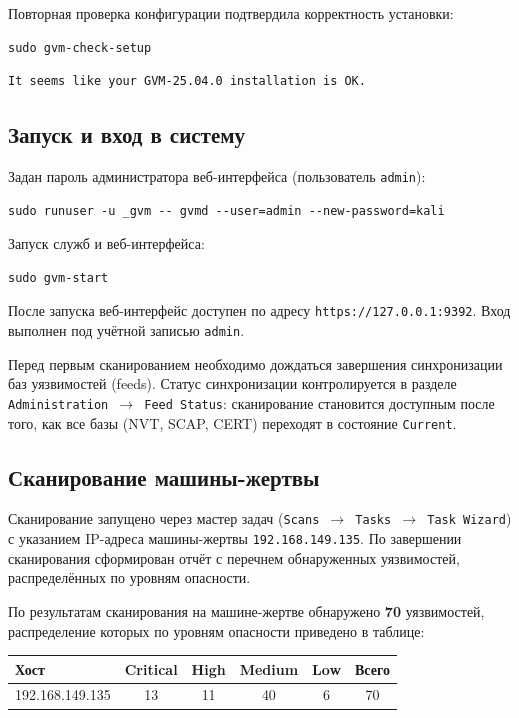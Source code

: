 \documentclass[a4paper,14pt]{extarticle}
\begin{document}
Повторная проверка конфигурации подтвердила корректность установки:

\begin{lstlisting}
sudo gvm-check-setup
\end{lstlisting}

\begin{lstlisting}
It seems like your GVM-25.04.0 installation is OK.
\end{lstlisting}

\subsection{Запуск и вход в систему}

Задан пароль администратора веб-интерфейса (пользователь \texttt{admin}):

\begin{lstlisting}
sudo runuser -u _gvm -- gvmd --user=admin --new-password=kali
\end{lstlisting}

Запуск служб и веб-интерфейса:

\begin{lstlisting}
sudo gvm-start
\end{lstlisting}

После запуска веб-интерфейс доступен по адресу \texttt{https://127.0.0.1:9392}. Вход выполнен под учётной записью \texttt{admin}.

Перед первым сканированием необходимо дождаться завершения синхронизации баз уязвимостей (feeds). Статус синхронизации контролируется в разделе \texttt{Administration~$\rightarrow$~Feed Status}: сканирование становится доступным после того, как все базы (NVT, SCAP, CERT) переходят в состояние \texttt{Current}.

\subsection{Сканирование машины-жертвы}

Сканирование запущено через мастер задач (\texttt{Scans~$\rightarrow$~Tasks~$\rightarrow$~Task Wizard}) с указанием IP-адреса машины-жертвы \texttt{192.168.149.135}. По завершении сканирования сформирован отчёт с перечнем обнаруженных уязвимостей, распределённых по уровням опасности.

По результатам сканирования на машине-жертве обнаружено \textbf{70} уязвимостей, распределение которых по уровням опасности приведено в таблице:

\begin{center}
\begin{tabularx}{\textwidth}{|X|c|c|c|c|c|}
\hline
\textbf{Хост} & \textbf{Critical} & \textbf{High} & \textbf{Medium} & \textbf{Low} & \textbf{Всего} \\
\hline
192.168.149.135 & 13 & 11 & 40 & 6 & 70 \\
\hline
\end{tabularx}
\end{center}
\end{document}
